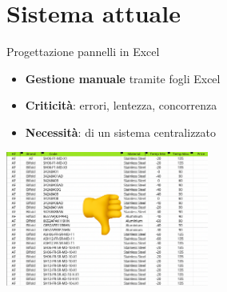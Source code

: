 \documentclass{beamer}
\begin{document}
\section{Sistema attuale}
\begin{frame}{Progettazione pannelli in Excel}
    \begin{itemize}
        \item \textbf{Gestione manuale} tramite fogli Excel
        \item \textbf{Criticità}: errori, lentezza, concorrenza
        \item \textbf{Necessità}: di un sistema centralizzato
    \end{itemize}
    \begin{center}
        \includegraphics[width=0.5\textwidth]{images/Informazioni prodotto industriale con errore.png} %
    \end{center}
\end{frame}

\end{document}

